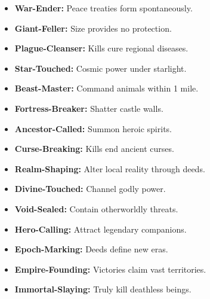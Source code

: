 \documentclass[10pt,twoside]{article}
\begin{document}
\hfill
\begin{minipage}[t]{0.48\textwidth}
\begin{itemize}[leftmargin=0.3cm, itemsep=0.1cm]
\item \textcolor{legendarycolor}{\textbf{War-Ender:}} \textcolor{legendarycolor}{Peace treaties form spontaneously.}
\item \textcolor{legendarycolor}{\textbf{Giant-Feller:}} \textcolor{legendarycolor}{Size provides no protection.}
\item \textcolor{legendarycolor}{\textbf{Plague-Cleanser:}} \textcolor{legendarycolor}{Kills cure regional diseases.}
\item \textcolor{legendarycolor}{\textbf{Star-Touched:}} \textcolor{legendarycolor}{Cosmic power under starlight.}
\item \textcolor{legendarycolor}{\textbf{Beast-Master:}} \textcolor{legendarycolor}{Command animals within 1 mile.}
\item \textcolor{legendarycolor}{\textbf{Fortress-Breaker:}} \textcolor{legendarycolor}{Shatter castle walls.}
\item \textcolor{legendarycolor}{\textbf{Ancestor-Called:}} \textcolor{legendarycolor}{Summon heroic spirits.}
\item \textcolor{legendarycolor}{\textbf{Curse-Breaking:}} \textcolor{legendarycolor}{Kills end ancient curses.}
\item \textcolor{legendarycolor}{\textbf{Realm-Shaping:}} \textcolor{legendarycolor}{Alter local reality through deeds.}
\item \textcolor{legendarycolor}{\textbf{Divine-Touched:}} \textcolor{legendarycolor}{Channel godly power.}
\item \textcolor{legendarycolor}{\textbf{Void-Sealed:}} \textcolor{legendarycolor}{Contain otherworldly threats.}
\item \textcolor{legendarycolor}{\textbf{Hero-Calling:}} \textcolor{legendarycolor}{Attract legendary companions.}
\item \textcolor{legendarycolor}{\textbf{Epoch-Marking:}} \textcolor{legendarycolor}{Deeds define new eras.}
\item \textcolor{legendarycolor}{\textbf{Empire-Founding:}} \textcolor{legendarycolor}{Victories claim vast territories.}
\item \textcolor{legendarycolor}{\textbf{Immortal-Slaying:}} \textcolor{legendarycolor}{Truly kill deathless beings.}
\end{itemize}
\end{minipage}
\end{document}

